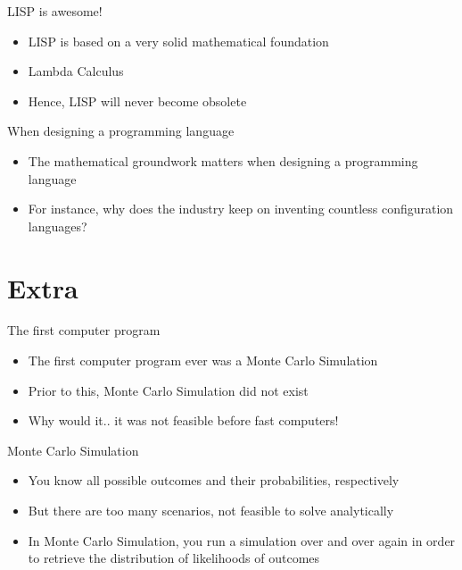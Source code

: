 \documentclass[utf8]{beamer}
\begin{document}
\begin{frame}{LISP is awesome!}
\begin{itemize}
\item LISP is based on a very solid mathematical foundation
\item Lambda Calculus
\item Hence, LISP will never become obsolete
\end{itemize}
\end{frame}

\begin{frame}{When designing a programming language}
\begin{itemize}
\item The mathematical groundwork matters when designing a programming language
\item For instance, why does the industry keep on inventing countless configuration languages?
\end{itemize}
\end{frame}

\part{Extra}
\begin{frame}
\partpage
\end{frame}

\begin{frame}{The first computer program}
\begin{itemize}
\item The first computer program ever was a Monte Carlo Simulation
\item Prior to this, Monte Carlo Simulation did not exist
\item Why would it.. it was not feasible before fast computers!
\end{itemize}
\end{frame}

\begin{frame}{Monte Carlo Simulation}
\begin{itemize}
\item You know all possible outcomes and their probabilities, respectively
\item But there are too many scenarios, not feasible to solve analytically
\item In Monte Carlo Simulation, you run a simulation over and over again in order to retrieve the distribution of
likelihoods of outcomes
\end{itemize}
\end{frame}
\end{document}

